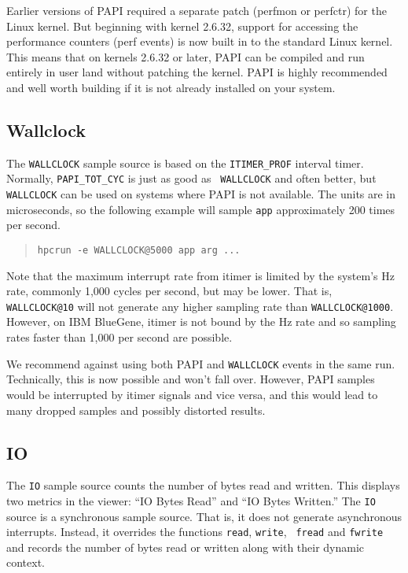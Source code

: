 Earlier versions of PAPI required a separate patch (perfmon or
perfctr) for the Linux kernel.  But beginning with kernel 2.6.32,
support for accessing the performance counters (perf events) is now
built in to the standard Linux kernel.  This means that on kernels
2.6.32 or later, PAPI can be compiled and run entirely in user land
without patching the kernel.  PAPI is highly recommended and well
worth building if it is not already installed on your system.

\subsection{Wallclock}

The {\tt WALLCLOCK} sample source is based on the \verb|ITIMER_PROF|
interval timer.  Normally, \verb|PAPI_TOT_CYC| is just as good as {\tt
WALLCLOCK} and often better, but {\tt WALLCLOCK} can be used on
systems where PAPI is not available.  The units are in microseconds,
so the following example will sample {\tt app} approximately 200
times per second.

\begin{quote}
\begin{verbatim}
hpcrun -e WALLCLOCK@5000 app arg ...
\end{verbatim}
\end{quote}

Note that the maximum interrupt rate from itimer is limited by the
system's Hz rate, commonly 1,000 cycles per second, but may be lower.
That is, {\tt WALLCLOCK@10} will not generate any higher sampling rate
than {\tt WALLCLOCK@1000}.  However, on IBM BlueGene, itimer is not
bound by the Hz rate and so sampling rates faster than 1,000 per
second are possible.

We recommend against using both PAPI and {\tt WALLCLOCK} events in the
same run.  Technically, this is now possible and \hpcrun{} won't fall
over.  However, PAPI samples would be interrupted by itimer signals
and vice versa, and this would lead to many dropped samples and
possibly distorted results.

\subsection{IO}

The {\tt IO} sample source counts the number of bytes read and
written.  This displays two metrics in the viewer: ``IO Bytes Read''
and ``IO Bytes Written.''  The {\tt IO} source is a synchronous sample
source.  That is, it does not generate asynchronous interrupts.
Instead, it overrides the functions {\tt read}, {\tt write}, {\tt
fread} and {\tt fwrite} and records the number of bytes read or
written along with their dynamic context.

